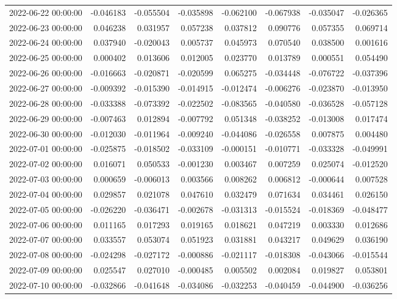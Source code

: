 \begin{tabular}{lrrrrrrr}
2022-06-22 00:00:00 & -0.046183 & -0.055504 & -0.035898 & -0.062100 & -0.067938 & -0.035047 & -0.026365 \\
2022-06-23 00:00:00 & 0.046238 & 0.031957 & 0.057238 & 0.037812 & 0.090776 & 0.057355 & 0.069714 \\
2022-06-24 00:00:00 & 0.037940 & -0.020043 & 0.005737 & 0.045973 & 0.070540 & 0.038500 & 0.001616 \\
2022-06-25 00:00:00 & 0.000402 & 0.013606 & 0.012005 & 0.023770 & 0.013789 & 0.000551 & 0.054490 \\
2022-06-26 00:00:00 & -0.016663 & -0.020871 & -0.020599 & 0.065275 & -0.034448 & -0.076722 & -0.037396 \\
2022-06-27 00:00:00 & -0.009392 & -0.015390 & -0.014915 & -0.012474 & -0.006276 & -0.023870 & -0.013950 \\
2022-06-28 00:00:00 & -0.033388 & -0.073392 & -0.022502 & -0.083565 & -0.040580 & -0.036528 & -0.057128 \\
2022-06-29 00:00:00 & -0.007463 & 0.012894 & -0.007792 & 0.051348 & -0.038252 & -0.013008 & 0.017474 \\
2022-06-30 00:00:00 & -0.012030 & -0.011964 & -0.009240 & -0.044086 & -0.026558 & 0.007875 & 0.004480 \\
2022-07-01 00:00:00 & -0.025875 & -0.018502 & -0.033109 & -0.000151 & -0.010771 & -0.033328 & -0.049991 \\
2022-07-02 00:00:00 & 0.016071 & 0.050533 & -0.001230 & 0.003467 & 0.007259 & 0.025074 & -0.012520 \\
2022-07-03 00:00:00 & 0.000659 & -0.006013 & 0.003566 & 0.008262 & 0.006812 & -0.000644 & 0.007528 \\
2022-07-04 00:00:00 & 0.029857 & 0.021078 & 0.047610 & 0.032479 & 0.071634 & 0.034461 & 0.026150 \\
2022-07-05 00:00:00 & -0.026220 & -0.036471 & -0.002678 & -0.031313 & -0.015524 & -0.018369 & -0.048477 \\
2022-07-06 00:00:00 & 0.011165 & 0.017293 & 0.019165 & 0.018621 & 0.047219 & 0.003330 & 0.012686 \\
2022-07-07 00:00:00 & 0.033557 & 0.053074 & 0.051923 & 0.031881 & 0.043217 & 0.049629 & 0.036190 \\
2022-07-08 00:00:00 & -0.024298 & -0.027172 & -0.000886 & -0.021117 & -0.018308 & -0.043066 & -0.015544 \\
2022-07-09 00:00:00 & 0.025547 & 0.027010 & -0.000485 & 0.005502 & 0.002084 & 0.019827 & 0.053801 \\
2022-07-10 00:00:00 & -0.032866 & -0.041648 & -0.034086 & -0.032253 & -0.040459 & -0.044900 & -0.036256 \\

\end{tabular}
